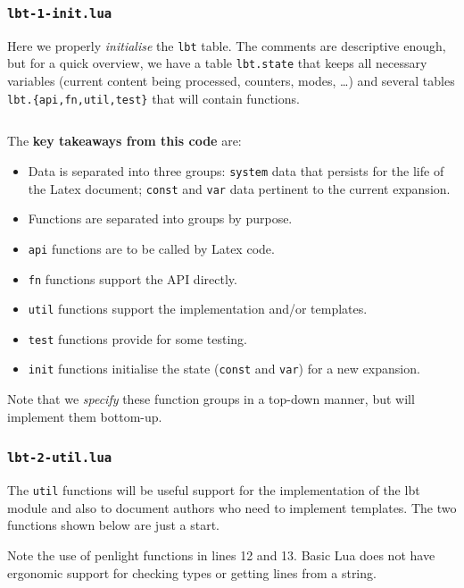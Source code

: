 \documentclass[11pt]{article}
\newcommand{\lbtlabel}{\textsf{lbt}}
\newcommand{\lbtpkg}{\texttt{lbt}}
\begin{document}
\subsubsection{\texttt{lbt-1-init.lua}}

Here we properly \emph{initialise} the \lbtpkg{} table. The comments are descriptive enough, but for a quick overview, we have a table \texttt{lbt.state} that keeps all necessary variables (current content being processed, counters, modes, \dots) and several tables \texttt{lbt.\{api,fn,util,test\}} that will contain functions.

\inputminted{lua}{media/impl-lbt-1-init.lua}

The \textbf{key takeaways from this code} are:
\begin{itemize}
  \item Data is separated into three groups: \texttt{system} data that persists for the life of the Latex document; \texttt{const} and \texttt{var} data pertinent to the current expansion.
  \item Functions are separated into groups by purpose.
  \item \texttt{api} functions are to be called by Latex code.
  \item \texttt{fn} functions support the API directly.
  \item \texttt{util} functions support the implementation and/or templates.
  \item \texttt{test} functions provide for some testing.
  \item \texttt{init} functions initialise the state (\texttt{const} and \texttt{var}) for a new expansion.
\end{itemize}

Note that we \emph{specify} these function groups in a top-down manner, but will implement them bottom-up.


\subsubsection{\texttt{lbt-2-util.lua}}

The \texttt{util} functions will be useful support for the implementation of the \lbtlabel{} module and also to document authors who need to implement templates. The two functions shown below are just a start.

Note the use of \textsf{penlight} functions in lines 12 and 13. Basic Lua does not have ergonomic support for checking types or getting lines from a string.
\end{document}
